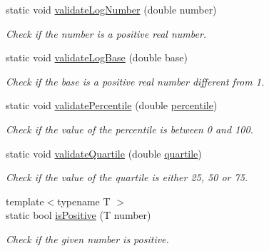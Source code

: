 \begin{DoxyCompactItemize}
static void \hyperlink{classmultiscale_1_1Numeric_a284b70a2cd738a3f37a45439aeb0934c}{validate\-Log\-Number} (double number)
\begin{DoxyCompactList}\small\item\em Check if the number is a positive real number. \end{DoxyCompactList}\item 
static void \hyperlink{classmultiscale_1_1Numeric_a5d8734939e6074e75f6363ac4cfb8d45}{validate\-Log\-Base} (double base)
\begin{DoxyCompactList}\small\item\em Check if the base is a positive real number different from 1. \end{DoxyCompactList}\item 
static void \hyperlink{classmultiscale_1_1Numeric_abe940f7b4f7320912b34590d8297ab7e}{validate\-Percentile} (double \hyperlink{classmultiscale_1_1Numeric_aff0c6b0c3d82bec3761a5e2d08394513}{percentile})
\begin{DoxyCompactList}\small\item\em Check if the value of the percentile is between 0 and 100. \end{DoxyCompactList}\item 
static void \hyperlink{classmultiscale_1_1Numeric_aac8bb87dfc3d3f039089c7b1b5225641}{validate\-Quartile} (double \hyperlink{classmultiscale_1_1Numeric_a127a2b3e5e659b4e493767ba23fc45da}{quartile})
\begin{DoxyCompactList}\small\item\em Check if the value of the quartile is either 25, 50 or 75. \end{DoxyCompactList}\item 
{\footnotesize template$<$typename T $>$ }\\static bool \hyperlink{classmultiscale_1_1Numeric_ac35688ef6f37f33cdf8f91999c07f414}{is\-Positive} (T number)
\begin{DoxyCompactList}\small\item\em Check if the given number is positive. \end{DoxyCompactList}\end{DoxyCompactItemize}
